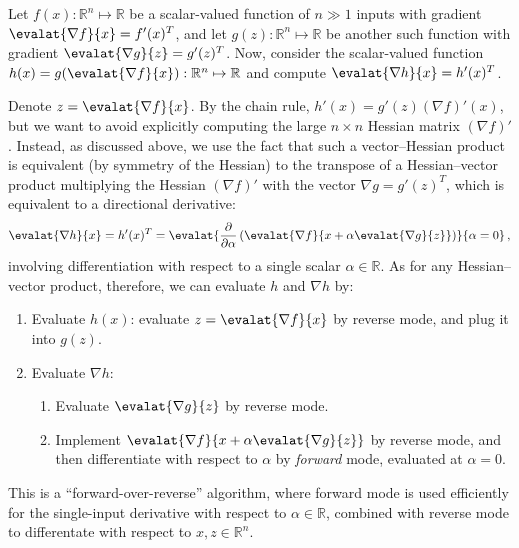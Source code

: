 \begin{example}

Let $f(x): \mathbb{R}^n \mapsto \mathbb{R}$ be a scalar-valued function of $n \gg 1$ inputs with gradient $\evalat{\nabla f}{x} = f'(x)^T$, and let $g(z): \mathbb{R}^n \mapsto \mathbb{R}$ be another such function with gradient $\evalat{\nabla g}{z} = g'(z)^T$.  Now, consider the scalar-valued function $h(x) = g(\evalat{\nabla f}{x}): \mathbb{R}^n \mapsto \mathbb{R}$ and compute $\evalat{\nabla h}{x} = h'(x)^T$.

Denote $z = \evalat{\nabla f}{x}$. By the chain rule, $h'(x) = g'(z)(\nabla f)'(x)$, but we want to avoid explicitly computing the large $n \times n$ Hessian matrix $(\nabla f)'$.  Instead, as discussed above, we use the fact that such a vector--Hessian product is equivalent (by symmetry of the Hessian) to the transpose of a Hessian--vector product multiplying the Hessian $(\nabla f)'$ with the vector $\nabla g = g'(z)^T$, which is equivalent to a directional derivative:
$$
\evalat{\nabla h}{x} = h'(x)^T =
\evalat{\frac{\partial}{\partial\alpha} \left( \evalat{\nabla f}{x + \alpha \evalat{\nabla g}{z}}\right)}{\alpha = 0} \, ,
$$
involving differentiation with respect to a single scalar $\alpha \in \mathbb{R}$.   As for any Hessian--vector product, therefore, we can evaluate $h$ and $\nabla h$ by:
\begin{enumerate}
    \item Evaluate $h(x)$: evaluate $z = \evalat{\nabla f}{x}$ by reverse mode, and plug it into $g(z)$.
    \item Evaluate $\nabla h$:
    \begin{enumerate}
      \item Evaluate $\evalat{\nabla g}{z}$ by reverse mode.
      \item Implement $\evalat{\nabla f}{x + \alpha \evalat{\nabla g}{z} }$ by reverse mode, and then differentiate with respect to $\alpha$ by \emph{forward} mode, evaluated at $\alpha = 0$.
    \end{enumerate}
\end{enumerate}
This is a ``forward-over-reverse'' algorithm, where forward mode is used efficiently for the single-input derivative with respect to $\alpha \in \mathbb{R}$, combined with reverse mode to differentate with respect to $x,z \in \mathbb{R}^n$.
\end{example}

